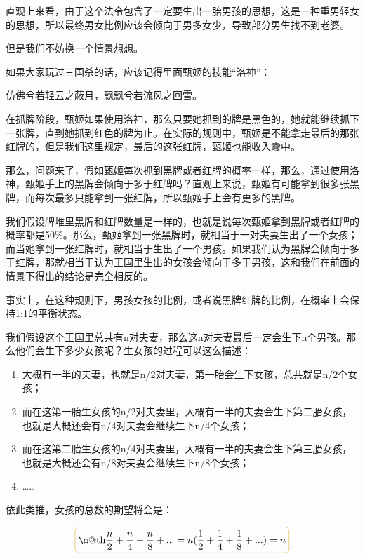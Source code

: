 \documentclass[export, 12pt, letterpaper]{ctexrep}
\makeatletter
\newcommand*{\boxcolor}{Peru}
\renewcommand{\boxed}[1]{\textcolor{\boxcolor}{%
\tikz[baseline={([yshift=-1ex]current bounding box.center)}] \node [rectangle, minimum width=1ex,rounded corners,draw] {\normalcolor\m@th$\displaystyle#1$};}}
\newenvironment{shadedquotation}
 {\begin{shaded*}
  \quoting[leftmargin=5pt, rightmargin=5pt, vskip=0pt]
 }
 {\endquoting
 \end{shaded*}
}
\makeatother
\begin{document}
直观上来看，由于这个法令包含了一定要生出一胎男孩的思想，这是一种重男轻女的思想，所以最终男女比例应该会倾向于男多女少，导致部分男生找不到老婆。

但是我们不妨换一个情景想想。

如果大家玩过三国杀的话，应该记得里面甄姬的技能“洛神”：

\begin{shadedquotation}
\noindent
仿佛兮若轻云之蔽月，飘飘兮若流风之回雪。
\end{shadedquotation}


在抓牌阶段，甄姬如果使用洛神，那么只要她抓到的牌是黑色的，她就能继续抓下一张牌，直到她抓到红色的牌为止。在实际的规则中，甄姬是不能拿走最后的那张红牌的，但是我们这里规定，最后的这张红牌，甄姬也能收入囊中。

那么，问题来了，假如甄姬每次抓到黑牌或者红牌的概率一样，那么，通过使用洛神，甄姬手上的黑牌会倾向于多于红牌吗？直观上来说，甄姬有可能拿到很多张黑牌，而每次最多只能拿到一张红牌，所以甄姬手上会有更多的黑牌。

我们假设牌堆里黑牌和红牌数量是一样的，也就是说每次甄姬拿到黑牌或者红牌的概率都是50\%。那么，甄姬拿到一张黑牌时，就相当于一对夫妻生出了一个女孩；而当她拿到一张红牌时，就相当于生出了一个男孩。如果我们认为黑牌会倾向于多于红牌，那就相当于认为王国里生出的女孩会倾向于多于男孩，这和我们在前面的情景下得出的结论是完全相反的。

事实上，在这种规则下，男孩女孩的比例，或者说黑牌红牌的比例，在概率上会保持1:1的平衡状态。

我们假设这个王国里总共有n对夫妻，那么这n对夫妻最后一定会生下n个男孩。那么他们会生下多少女孩呢？生女孩的过程可以这么描述：

\begin{enumerate}
\item{ 大概有一半的夫妻，也就是n/2对夫妻，第一胎会生下女孩，总共就是n/2个女孩； }
\item{ 而在这第一胎生女孩的n/2对夫妻里，大概有一半的夫妻会生下第二胎女孩，也就是大概还会有n/4对夫妻会继续生下n/4个女孩； }
\item{ 而在这第二胎生女孩的n/4对夫妻里，大概有一半的夫妻会生下第三胎女孩，也就是大概还会有n/8对夫妻会继续生下n/8个女孩； }
\item{ …… }
\end{enumerate}


依此类推，女孩的总数的期望将会是：

$$\boxed{
\frac{n}{2} + \frac{n}{4} + \frac{n}{8} + ... = n (\frac{1}{2} + \frac{1}{4} + \frac{1}{8} + ...) = n
}$$
\end{document}
